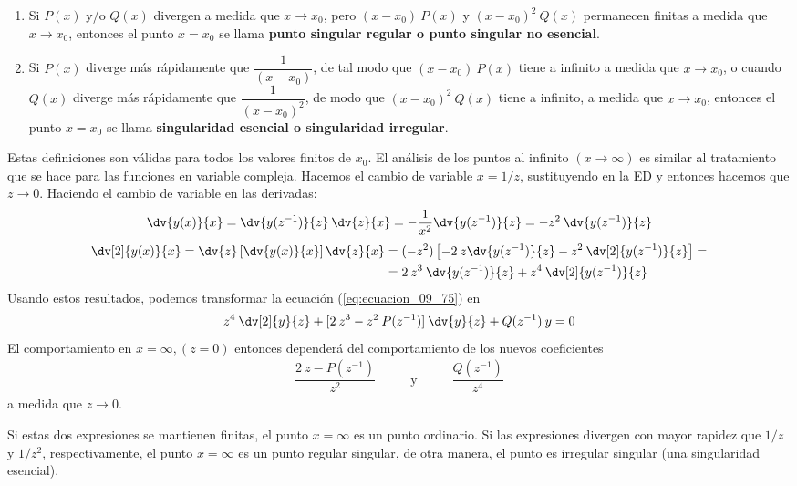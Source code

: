 \begin{enumerate}
\item Si $P(x)$ y/o $Q(x)$ divergen a medida que $x \to x_{0}$, pero $(x - x_{0}) \: P(x)$ y $(x - x_{0})^{2} \: Q(x)$ permanecen finitas a medida que $x \to x_{0}$, entonces el punto $x = x_{0}$ se llama \textbf{punto singular regular o punto singular no esencial}.
\item Si $P(x)$ diverge más rápidamente que $\dfrac{1}{(x - x_{0})}$, de tal modo que $(x - x_{0}) \: P(x)$ tiene a infinito a medida que $x \to x_{0}$, o cuando $Q(x)$ diverge más rápidamente que $\dfrac{1}{(x - x_{0})^{2}}$, de modo que $(x - x_{0})^{2} \: Q(x)$ tiene a infinito, a medida que $x \to x_{0}$, entonces el punto $x = x_{0}$ se llama \textbf{singularidad esencial o singularidad irregular}.
\end{enumerate}
\par
Estas definiciones son válidas para todos los valores finitos de $x_{0}$. El análisis de los puntos al infinito $(x \to \infty)$ es similar al tratamiento que se hace para las funciones en variable compleja. Hacemos el cambio de variable $x = 1/z$, sustituyendo en la ED y entonces hacemos que $z \to 0$. Haciendo el cambio de variable en las derivadas:
\begin{align}
\dv{y(x)}{x} = \dv{y(z^{-1})}{z} \: \dv{z}{x} = - \dfrac{1}{x^{2}} \dv{y(z^{-1})}{z} = -z^{2} \: \dv{y(z^{-1})}{z}
\label{eq:ecuacion_09_76}
\end{align}
\begin{align}
\begin{aligned}
\dv[2]{y(x)}{x} = \dv{z} \left[ \dv{y(x)}{x} \right] \dv{z}{x} &= (-z^{2}) \left[ -2 \: z \dv{y(z^{-1})}{z} - z^{2} \: \dv[2]{y(z^{-1})}{z} \right] = \\
&= 2 \: z^{3} \: \dv{y(z^{-1})}{z} + z^{4} \: \dv[2]{y(z^{-1})}{z}
\end{aligned}
\label{eq:ecuacion_09_77}
\end{align}
Usando estos resultados, podemos transformar la ecuación (\ref{eq:ecuacion_09_75}) en
\begin{align}
z^{4} \: \dv[2]{y}{z} + [ 2 \: z^{3} - z^{2} \: P(z^{-1})] \: \dv{y}{z} + Q(z^{-1}) \: y = 0
\label{eq:ecuacion_09_78}
\end{align}
El comportamiento en $x = \infty, (z = 0)$ entonces dependerá del comportamiento de los nuevos coeficientes
\begin{align*}
\dfrac{2 \: z - P(z^{-1})}{z^{2}} \hspace{1cm} \text{ y } \hspace{1cm} \dfrac{Q(z^{-1})}{z^{4}}
\end{align*}
a medida que $z \to 0$.
\par
Si estas dos expresiones se mantienen finitas, el punto $x = \infty$ es un punto ordinario. Si las expresiones divergen con mayor rapidez que $1/z$ y $1/z^{2}$, respectivamente, el punto $x = \infty$ es un punto regular singular, de otra manera, el punto es irregular singular (una singularidad esencial).

